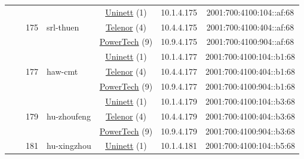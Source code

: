 \begin{small}
\begin{center}
\begin{longtable}{|c|c|c|c|c|c|c|c|}
  &  & \multirow{3}{*}{\tiny{175}} & \multicolumn{1}{|l|}{\multirow{3}{*}{\tiny{srl-thuen}}} & \multicolumn{2}{|c|}{\tiny{\href{https://www.uninett.no}{Uninett} (1)}} & \tiny{10.1.4.175} & \tiny{2001:700:4100:104::af:68} \\* \cline{5-5}\cline{6-6}\cline{7-7}\cline{8-8}
  &  &  &  & \multicolumn{2}{|c|}{\tiny{\href{https://www.telenor.no}{Telenor} (4)}} & \tiny{10.4.4.175} & \tiny{2001:700:4100:404::af:68} \\* \cline{5-5}\cline{6-6}\cline{7-7}\cline{8-8}
  &  &  &  & \multicolumn{2}{|c|}{\tiny{\href{http://www.powertech.no}{PowerTech} (9)}} & \tiny{10.9.4.175} & \tiny{2001:700:4100:904::af:68} \\* \cline{3-3}\cline{4-4}\cline{5-5}\cline{6-6}\cline{7-7}\cline{8-8}
  &  & \multirow{3}{*}{\tiny{177}} & \multicolumn{1}{|l|}{\multirow{3}{*}{\tiny{haw-cmt}}} & \multicolumn{2}{|c|}{\tiny{\href{https://www.uninett.no}{Uninett} (1)}} & \tiny{10.1.4.177} & \tiny{2001:700:4100:104::b1:68} \\* \cline{5-5}\cline{6-6}\cline{7-7}\cline{8-8}
  &  &  &  & \multicolumn{2}{|c|}{\tiny{\href{https://www.telenor.no}{Telenor} (4)}} & \tiny{10.4.4.177} & \tiny{2001:700:4100:404::b1:68} \\* \cline{5-5}\cline{6-6}\cline{7-7}\cline{8-8}
  &  &  &  & \multicolumn{2}{|c|}{\tiny{\href{http://www.powertech.no}{PowerTech} (9)}} & \tiny{10.9.4.177} & \tiny{2001:700:4100:904::b1:68} \\* \cline{3-3}\cline{4-4}\cline{5-5}\cline{6-6}\cline{7-7}\cline{8-8}
  &  & \multirow{3}{*}{\tiny{179}} & \multicolumn{1}{|l|}{\multirow{3}{*}{\tiny{hu-zhoufeng}}} & \multicolumn{2}{|c|}{\tiny{\href{https://www.uninett.no}{Uninett} (1)}} & \tiny{10.1.4.179} & \tiny{2001:700:4100:104::b3:68} \\* \cline{5-5}\cline{6-6}\cline{7-7}\cline{8-8}
  &  &  &  & \multicolumn{2}{|c|}{\tiny{\href{https://www.telenor.no}{Telenor} (4)}} & \tiny{10.4.4.179} & \tiny{2001:700:4100:404::b3:68} \\* \cline{5-5}\cline{6-6}\cline{7-7}\cline{8-8}
  &  &  &  & \multicolumn{2}{|c|}{\tiny{\href{http://www.powertech.no}{PowerTech} (9)}} & \tiny{10.9.4.179} & \tiny{2001:700:4100:904::b3:68} \\* \cline{3-3}\cline{4-4}\cline{5-5}\cline{6-6}\cline{7-7}\cline{8-8}
  &  & \multirow{3}{*}{\tiny{181}} & \multicolumn{1}{|l|}{\multirow{3}{*}{\tiny{hu-xingzhou}}} & \multicolumn{2}{|c|}{\tiny{\href{https://www.uninett.no}{Uninett} (1)}} & \tiny{10.1.4.181} & \tiny{2001:700:4100:104::b5:68} \\* \cline{5-5}\cline{6-6}\cline{7-7}\cline{8-8}

\end{longtable}
\end{center}
\end{small}
